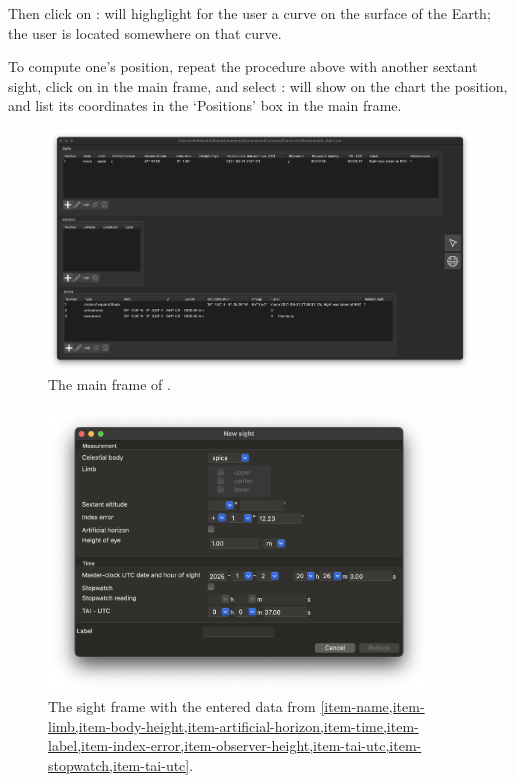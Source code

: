 \documentclass{ol-softwaremanual}
\begin{document}
  Then click on : \thel will highglight for the user a curve on the surface of the Earth; the user is located somewhere on that curve. 

To compute one's position, repeat the procedure above with another sextant sight, click on  in the main frame, and select : \thel will show on the chart the position, and list its coordinates in the `Positions' box in the main frame. 

\begin{figure}
  \centering
  \includegraphics[width=1\textwidth]{figures/list-frame.png}
  \caption{
    \label{fig-list-frame}
    The main frame of \thel. 
  }
  \end{figure}


  \begin{figure}
    \centering
    \includegraphics[width=0.9\textwidth]{figures/sight-frame.png}
    \caption{
      \label{fig-sight-frame}
      The sight frame with the entered data from \cref{item-name,item-limb,item-body-height,item-artificial-horizon,item-time,item-label,item-index-error,item-observer-height,item-tai-utc,item-stopwatch,item-tai-utc}. 
    }
  \end{figure}
\end{document}
